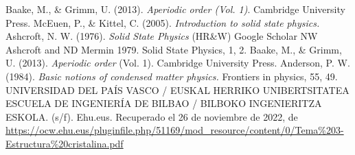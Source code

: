 \nocite{*}
%
%

\begin{thebibliography}{00}
 Baake, M., \& Grimm, U. (2013). \textit{Aperiodic order (Vol. 1)}. Cambridge University Press.
 McEuen, P., \& Kittel, C. (2005). \textit{Introduction to solid state physics.}
 Ashcroft, N. W. (1976). \textit{Solid State Physics} (HR\&W) Google Scholar NW Ashcroft and ND Mermin 1979. Solid State Physics, 1, 2.
 Baake, M., \& Grimm, U. (2013). \textit{Aperiodic order} (Vol. 1). Cambridge University Press.
 Anderson, P. W. (1984). \textit{Basic notions of condensed matter physics.} Frontiers in physics, 55, 49.
 UNIVERSIDAD DEL PAÍS VASCO / EUSKAL HERRIKO UNIBERTSITATEA ESCUELA DE INGENIERÍA DE BILBAO / BILBOKO INGENIERITZA ESKOLA. (s/f). Ehu.eus. Recuperado el 26 de noviembre de 2022, de \url{https://ocw.ehu.eus/pluginfile.php/51169/mod_resource/content/0/Tema\%203-Estructura\%20cristalina.pdf}


\end{thebibliography}






